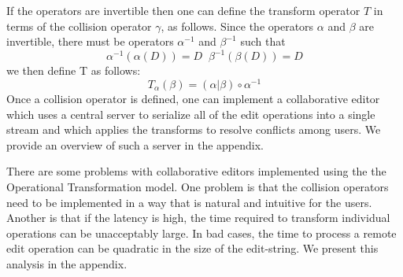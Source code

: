 \documentclass{amsart}
\begin{document}
If the operators are invertible then one can define 
the transform operator $T$ in terms of the collision
operator $\gamma$, as follows. Since the operators $\alpha$ 
and $\beta$ are invertible, there must be
operators $\alpha^{-1}$ and $\beta^{-1}$ such that
\[
\alpha^{-1}(\alpha(D)) = D \;\;
\beta^{-1}(\beta(D)) = D 
\]
we then define T as follows:
\[
T_\alpha(\beta) = (\alpha \vert \beta) \circ \alpha^{-1}
\]
Once a collision operator is defined, 
one can implement a collaborative editor which uses a central
server to serialize all of the edit operations into a single stream 
and which applies the transforms to resolve
conflicts among users.  We provide an overview of such a server in the appendix.

There are some problems with collaborative editors implemented
using the the Operational Transformation model.  One problem is that the
collision operators need to be implemented in a way that is natural and
intuitive for the users.  Another is that if the latency is high, the time
required to transform individual operations can be unacceptably large. In
bad cases, the time to process a remote edit operation can be quadratic
in the size of the edit-string. We present this analysis in the appendix.
\end{document}
